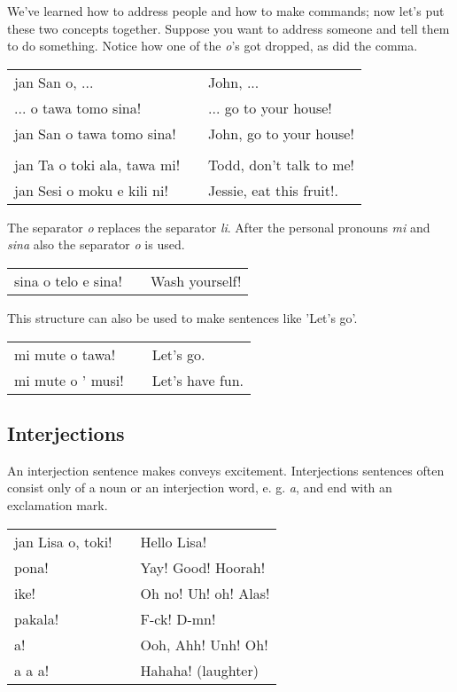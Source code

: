 We've learned how to address people and how to make commands; now let's put these two concepts together. 
Suppose you want to address someone and tell them to do something. 
Notice how one of the \textit{o}'s got dropped, as did the comma. 

\begin{supertabular}{p{5,5cm}|ll}
jan San o, ...  && John, ... \\ %
 ... o tawa tomo sina! && ... go to your house! \\ %
jan San o tawa tomo sina!  && John, go to your house! \\
 && \\ %
jan Ta o toki ala, tawa mi! && Todd, don't talk to me! \\
jan Sesi o moku e kili ni! && Jessie, eat this fruit!. \\
\end{supertabular} 

The separator \textit{o} replaces the separator \textit{li}. 
After the personal pronouns \textit{mi} and \textit{sina} also the separator \textit{o} is used. 

\begin{supertabular}{p{5,5cm}|ll}
sina o telo e sina! && Wash yourself! \\
\end{supertabular} 

This structure can also be used to make sentences like 'Let's go'.

\begin{supertabular}{p{5,5cm}|ll}
mi mute o tawa! && Let's go. \\
mi mute o ' musi! && Let's have fun. \\
\end{supertabular} 
%
\subsection*{Interjections}
%
%
An interjection sentence makes conveys excitement.
Interjections sentences often consist only of a noun or an interjection word, e. g. \textit{a}, and end with an exclamation mark.

\begin{supertabular}{p{5,5cm}|ll}
jan Lisa o, toki! && Hello Lisa! \\
pona! && Yay! Good! Hoorah! \\
ike! && Oh no! Uh! oh! Alas! \\
pakala! && F-ck! D-mn! \\
a! && Ooh, Ahh! Unh! Oh! \\
a a a! && Hahaha! (laughter) \\
\end{supertabular} 

